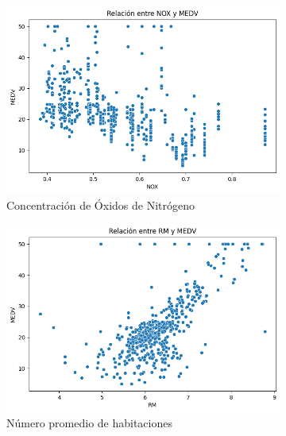 \documentclass[12pt,a4paper]{article}
\begin{document}
\begin{figure}[H]
\begin{subfigure}[t]{0.24\textwidth}
    \centering
    \includegraphics[width=\textwidth]{images/nox_medv.png}
    \caption{\footnotesize Concentración de Óxidos de Nitrógeno}
    \label{fig:modelo_nox}
\end{subfigure}
\hfill
\begin{subfigure}[t]{0.24\textwidth}
    \centering
    \includegraphics[width=\textwidth]{images/rm_medv.png}
    \caption{\footnotesize Número promedio de habitaciones}
    \label{fig:modelo_rm}
\end{subfigure}
\hfill
\begin{subfigure}[t]{0.24\textwidth}
    \centering

\end{subfigure}
\end{figure}
\end{document}
